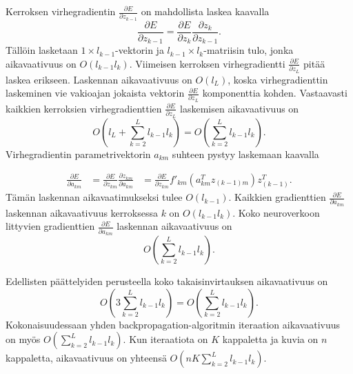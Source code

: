 \documentclass[11pt]{article}
\begin{document}
Kerroksen virhegradientin $\frac{\partial E}{\partial z_{k - 1}}$ on mahdollista laskea kaavalla 
\begin{equation*}
\frac{\partial E}{\partial z_{k - 1}} = \frac{\partial E}{\partial z_{k}} \frac{\partial z_{k}}{\partial z_{k - 1}}.
\end{equation*}
Tällöin lasketaan $1 \times l_{k - 1}$-vektorin ja $l_{k - 1} \times l_k$-matriisin tulo, jonka aikavaativuus on $O(l_{k - 1} l_k)$. Viimeisen kerroksen virhegradientti $\frac{\partial E}{\partial z_{L}}$ pitää laskea erikseen. Laskennan aikavaativuus on $O(l_L)$, koska virhegradienttin laskeminen vie vakioajan jokaista vektorin $\frac{\partial E}{\partial z_{L}}$ komponenttia kohden. Vastaavasti kaikkien kerroksien virhegradienttien $\frac{\partial E}{\partial z_{L}}$ laskemisen aikavaativuus on
\begin{equation*}
O(l_L + \sum_{k = 2}^{L} l_{k - 1} l_{k}) = O(\sum_{k = 2}^{L} l_{k - 1} l_{k}).
\end{equation*}
 Virhegradientin parametrivektorin $a_{km}$ suhteen pystyy laskemaan kaavalla 

\begin{equation*}
\begin{aligned}
\frac{\partial E}{\partial a_{km}} &= \frac{\partial E}{\partial z_{km}}\frac{\partial z_{km}}{\partial a_{km}}
 &= \frac{\partial E}{\partial z_{km}} f'_{km}(a_{km}^Tz_{(k - 1)m})z_{(k - 1)}^T.
\end{aligned}
\end{equation*}
Tämän laskennan aikavaatimukseksi tulee $O(l_{k - 1})$. Kaikkien gradienttien $\frac{\partial E}{\partial a_{km}}$ laskennan aikavaativuus kerroksessa $k$ on $O(l_{k - 1} l_k)$. Koko neuroverkoon littyvien gradienttien $\frac{\partial E}{\partial a_{km}}$  laskennan aikavaativuus on
\begin{equation*}
O(\sum_{k = 2}^{L} l_{k - 1} l_{k}).
\end{equation*}

Edellisten päättelyiden perusteella koko takaisinvirtauksen aikavaativuus on 
\begin{equation*}
O(3 \sum_{k = 2}^{L} l_{k - 1} l_{k}) = O(\sum_{k = 2}^{L} l_{k - 1} l_{k}).
\end{equation*}
Kokonaisuudessaan yhden backpropagation-algoritmin iteraation aikavaativuus on myös $O(\sum_{k = 2}^{L} l_{k - 1} l_{k})$. Kun iteraatiota on $K$ kappaletta ja kuvia on $n$ kappaletta, aikavaativuus on yhteensä $O(nK\sum_{k = 2}^{L} l_{k - 1} l_{k})$.
\end{document}
